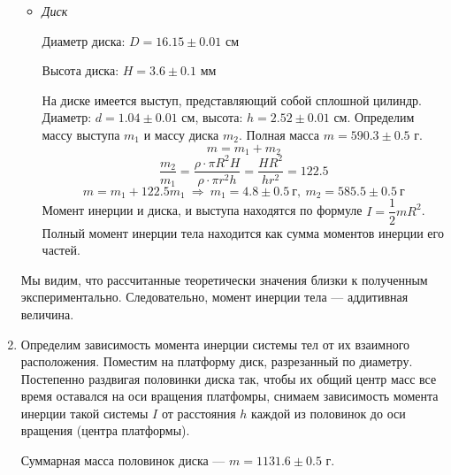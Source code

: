 \documentclass[a4paper,12pt]{article}
\begin{document}
\begin{enumerate}
\begin{itemize}
		\item \textit{Диск}
		
		Диаметр диска: $D = 16.15\pm 0.01$ см

		Высота диска: $H = 3.6\pm 0.1$ мм

		На диске имеется выступ, представляющий собой сплошной цилиндр. Диаметр: $d = 1.04\pm 0.01$ см, высота: $h = 2.52\pm 0.01$ см. Определим массу выступа $m_1$ и массу диска $m_2$. Полная масса $m = 590.3\pm 0.5$ г.
		$$
		m = m_1 + m_2
		$$
		$$
		\frac{m_2}{m_1} = \frac{\rho\cdot\pi R^2H}{\rho\cdot\pi r^2h} = \frac{HR^2}{hr^2} = 122.5
		$$
		$$
		m = m_1 + 122.5m_1~\Rightarrow~m_1 = 4.8\pm 0.5~\text{г},~m_2 = 585.5\pm 0.5~\text{г}
		$$
		Момент инерции и диска, и выступа находятся по формуле $I = \dfrac{1}{2}mR^2$. Полный момент инерции тела находится как сумма моментов инерции его частей.
	\end{itemize}
	Мы видим, что рассчитанные теоретически значения близки к полученным экспериментально. Следовательно, момент инерции тела --- аддитивная величина.

	\item
	Определим зависимость момента инерции системы тел от их взаимного расположения. Поместим на платформу диск, разрезанный по диаметру. Постепенно раздвигая половинки диска так, чтобы их общий центр масс все время оставался на оси вращения платфомры, снимаем зависимость момента инерции такой системы $I$ от расстояния $h$ каждой из половинок до оси вращения (центра платформы).
	
	Суммарная масса половинок диска --- $m = 1131.6\pm 0.5$ г.
	

\end{enumerate}
\end{document}
